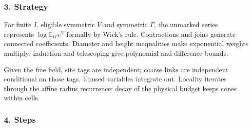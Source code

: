 \documentclass[
  letterpaper,
  11pt]{article}
\begin{document}
\subsubsection{3. Strategy}\label{strategy-10}

For finite \(I\), eligible symmetric \(V\) and symmetric \(\Gamma\), the
unmarked series represents \(\log\mathbb E_{t\Gamma}e^V\) formally by
Wick's rule. Contractions and joins generate connected coefficients.
Diameter and height inequalities make exponential weights multiply;
induction and telescoping give polynomial and difference bounds.

Given the fine field, site tags are independent; coarse links are
independent conditional on those tags. Unused variables integrate out.
Locality iterates through the affine radius recurrence; decay of the
physical budget keeps cones within cells.

\subsubsection{4. Steps}\label{steps-10}
\end{document}
